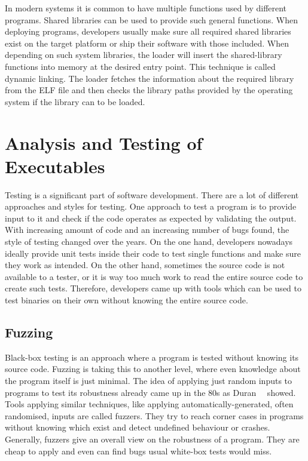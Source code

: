 In modern systems it is common to have multiple functions used by different
programs. Shared libraries can be used to provide such general functions. When
deploying programs, developers usually make sure all required shared libraries
exist on the target platform or ship their software with those included. When
depending on such system libraries, the loader will insert the shared-library
functions into memory at the desired entry point. This technique is called
dynamic linking. The loader fetches the information about the required library
from the ELF file and then checks the library paths provided by the operating
system if the library can to be loaded.

\section{Analysis and Testing of Executables}

Testing is a significant part of software development. There are a lot of
different approaches and styles for testing. One approach to test a program is
to provide input to it and check if the code operates as expected by validating
the output. With increasing amount of code and an increasing number of bugs
found, the style of testing changed over the years. On the one hand, developers
nowadays ideally provide unit tests inside their code to test single functions
and make sure they work as intended. On the other hand, sometimes the source
code is not available to a tester, or it is way too much work to read the entire
source code to create such tests. Therefore, developers came up with tools
which can be used to test binaries on their own without knowing the entire
source code.

\subsection{Fuzzing}

Black-box testing is an approach where a program is tested without knowing
its source code. Fuzzing is taking this to another level, where even knowledge
about the program itself is just minimal. The idea of applying just random
inputs to programs to test its robustness already came up in the 80s as
Duran~\etal~\cite{randtest} showed. Tools applying similar techniques, like
applying automatically-generated, often randomised, inputs are called fuzzers.
They try to reach corner cases in programs without knowing which exist and
detect undefined behaviour or crashes. Generally, fuzzers give an overall view
on the robustness of a program. They are cheap to apply and even can find bugs
usual white-box tests would miss.

